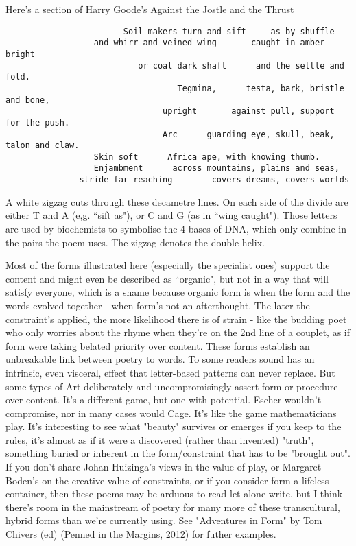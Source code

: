 \documentclass[11pt]{article}
\begin{document}
Here’s a section of Harry Goode’s Against the Jostle and the Thrust
\begin{verbatim}
                        Soil makers turn and sift     as by shuffle
                  and whirr and veined wing       caught in amber bright
                           or coal dark shaft      and the settle and fold.
                                   Tegmina,      testa, bark, bristle and bone,
                                upright       against pull, support for the push.
                                Arc      guarding eye, skull, beak, talon and claw.
                  Skin soft      Africa ape, with knowing thumb.
                  Enjambment      across mountains, plains and seas,
               stride far reaching        covers dreams, covers worlds
\end{verbatim}
A white zigzag cuts through these decametre lines. On each side of the divide are either T and A (e,g. “sift     as"), or C and G (as in “wing       caught"). Those letters are used by biochemists to symbolise the 4 bases of DNA, which only combine in the pairs the poem uses. The zigzag denotes the double-helix.

Most of the forms illustrated here (especially the specialist ones) support the content and might even be described as “organic", but not in a way that will satisfy everyone, which is a shame because organic form is when the form and the words evolved together - when form's not an afterthought. The later the constraint's applied, the more likelihood there is of strain - like the budding poet who only worries about the rhyme when they're on the 2nd line of a couplet, as if form were taking belated priority over content. These forms establish an unbreakable link between poetry to words. To some readers sound has an intrinsic, even visceral, effect that letter-based patterns can never replace. But some types of Art deliberately and uncompromisingly assert form or procedure over content. It's a different game, but one with potential. Escher wouldn't compromise, nor in many cases would Cage. It's like the game mathematicians play. It's interesting to see what "beauty" survives or emerges if you keep to the rules, it's almost as if it were a discovered (rather than invented) "truth", something buried or inherent in the form/constraint that has to be "brought out". If you don't share Johan Huizinga's views in the value of play, or Margaret Boden's on the creative value of constraints, or if you consider form a lifeless container, then these poems may be arduous to read let alone write, but I think there's room in the mainstream of poetry for many more of these transcultural, hybrid forms than we're currently using. See "Adventures in Form" by Tom Chivers (ed) (Penned in the Margins, 2012) for futher examples.
\end{document}
